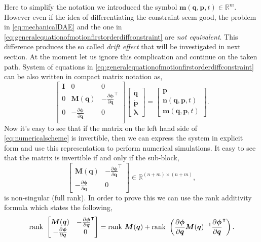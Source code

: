 		Here to simplify the notation we introduced the symbol $\bm{m}(\bm{q},\bm{p},t)\in\mathbb{R}^{m}$. However even if the idea of differentiating the constraint seem good, the problem in \cref{eq:mechanicalDAE} and the one in \cref{eq:generalequationofmotionfirstorderdiffconstraint} are \emph{not equivalent}. This difference produces the so called \emph{drift effect} that will be investigated in next section. At the moment let us ignore this complication and continue on the taken path. System of equations in \cref{eq:generalequationofmotionfirstorderdiffconstraint} can be also written in compact matrix notation as,
		\begin{equation}
			\label{eq:numericalscheme}
			\begin{bmatrix}
				\bm{I} 	&	0		&	0 \\
				0	& 	\bm{M}(\bm{q}) 	&	-\frac{\partial\bm{\phi}}{\partial\bm{q}}^{\intercal} \\
				0 	& -\frac{\partial\bm{\phi}}{\partial\bm{q}} & 0\\
			\end{bmatrix}
			\begin{bmatrix}
				\dot{\bm{q}}\\
				\dot{\bm{p}}\\
				\bm{\lambda}
			\end{bmatrix}
			= 
			\begin{bmatrix}
				\bm{p} \\
				\bm{n}(\bm{q},\bm{p},t) \\
				\bm{m}(\bm{q},\bm{p},t)
			\end{bmatrix}.
		\end{equation}
		Now it's easy to see that if the matrix on the left hand side of \cref{eq:numericalscheme} is invertible, then we can express the system in explicit form and use this representation to perform numerical simulations. 		
		It easy to see that the matrix is invertible if and only if the sub-block,
		\begin{equation*}
			\begin{bmatrix}
				\bm{M}(\bm{q}) & -\frac{\partial\bm{\phi}}{\partial\bm{q}}^{\intercal} \\
				-\frac{\partial\bm{\phi}}{\partial\bm{q}} & 0
			\end{bmatrix}\in\mathbb{R}^{(n+m)\times(n+m)},
		\end{equation*}
		is non-singular (full rank). In order to prove this we can use the rank additivity formula which states the following, 
		\begin{equation*}
		 	\mathrm{rank}~\begin{bmatrix}
		 		\bm{M}(\bm{q}) & -\frac{\partial\bm{\phi}}{\partial\bm{q}}^{\intercal} \\
		 		-\frac{\partial\bm{\phi}}{\partial\bm{q}} & 0
		 	\end{bmatrix} 
		 	= \mathrm{rank}~\bm{M}(\bm{q}) + \mathrm{rank}~\left( \frac{\partial\bm{\phi}}{\partial\bm{q}}\bm{M}(\bm{q})^{-1}\frac{\partial\bm{\phi}}{\partial\bm{q}}^{\intercal}\right).
		\end{equation*}
